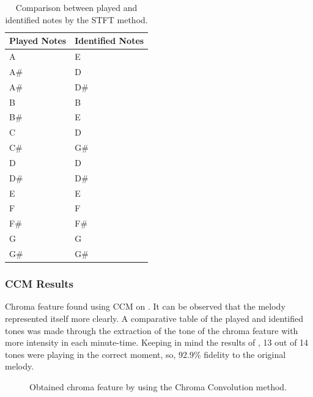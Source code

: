 \documentclass{article}
\begin{document}
	

	\begin{table}[h!]
	 \begin{center}
	 \begin{tabular}{|l|l|}
	  \hline
	  Played Notes & Identified Notes \\
	  \hline
	  A  & E \\
	  A\#  & D \\
	  A\#  & D\# \\
	  B  & B \\
	  B\#  & E \\
	  C  & D \\
	  C\#  & G\# \\
	  D  & D \\
	  D\#  & D\# \\
	  E  & E \\
	  F  & F \\
	  F\#  & F\# \\
	  G  & G \\
	  G\#  & G\# \\
	  \hline
	 \end{tabular}
	\end{center}
	 \caption{Comparison between played and identified notes by the STFT method.}
	 \label{tab:table-1-sfft}
	\end{table}

	


	\subsubsection{CCM Results}
	Chroma feature found using CCM on . It can be observed that the melody represented itself more clearly. A comparative table of the played and identified tones was made through the extraction of the tone of the chroma feature with more intensity in each minute-time. Keeping in mind the results of , 13 out of 14 tones were playing in the correct moment, so, 92.9\% fidelity to the original melody.
	
	\begin{figure}[h!]
	 \centerline{}
	 \caption{Obtained chroma feature by using the Chroma Convolution method.}
	 \label{fig:1-ccm}
	\end{figure}	
\end{document}
